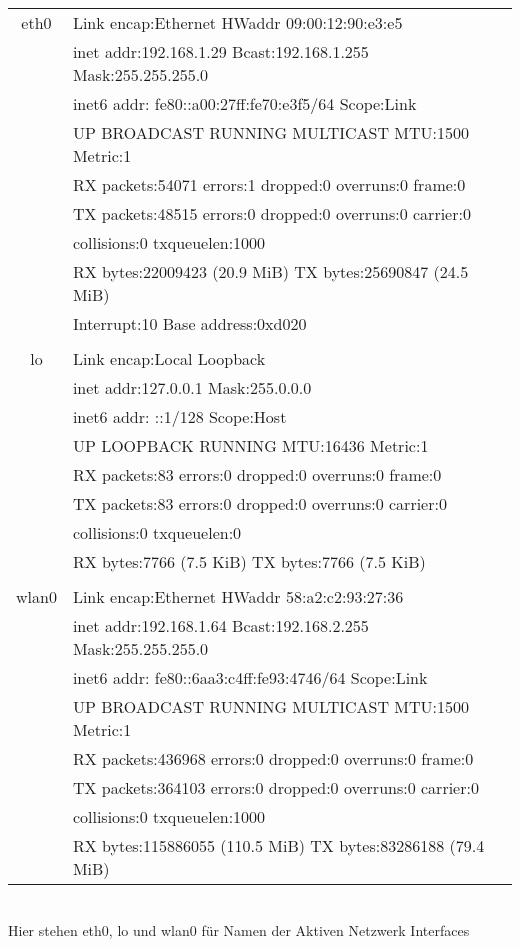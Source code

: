 \documentclass[12pt,a4paper]{report}
\theoremstyle{definition}
\begin{document}
\begin{tabular}{c l}
eth0 & Link encap:Ethernet  HWaddr 09:00:12:90:e3:e5\\  
 & inet addr:192.168.1.29 Bcast:192.168.1.255  Mask:255.255.255.0\\
 & inet6 addr: fe80::a00:27ff:fe70:e3f5/64 Scope:Link\\
 & UP BROADCAST RUNNING MULTICAST  MTU:1500  Metric:1\\
 & RX packets:54071 errors:1 dropped:0 overruns:0 frame:0\\
 & TX packets:48515 errors:0 dropped:0 overruns:0 carrier:0\\
 & collisions:0 txqueuelen:1000 \\
 & RX bytes:22009423 (20.9 MiB)  TX bytes:25690847 (24.5 MiB)\\
 & Interrupt:10 Base address:0xd020 \\
 & \\
lo & Link encap:Local Loopback  \\
 & inet addr:127.0.0.1  Mask:255.0.0.0\\
 & inet6 addr: ::1/128 Scope:Host\\
 & UP LOOPBACK RUNNING  MTU:16436  Metric:1\\
 & RX packets:83 errors:0 dropped:0 overruns:0 frame:0\\
 & TX packets:83 errors:0 dropped:0 overruns:0 carrier:0\\
 & collisions:0 txqueuelen:0 \\
 & RX bytes:7766 (7.5 KiB)  TX bytes:7766 (7.5 KiB)\\
 & \\
wlan0 & Link encap:Ethernet  HWaddr 58:a2:c2:93:27:36  \\
 & inet addr:192.168.1.64  Bcast:192.168.2.255  Mask:255.255.255.0\\
 & inet6 addr: fe80::6aa3:c4ff:fe93:4746/64 Scope:Link\\
 & UP BROADCAST RUNNING MULTICAST  MTU:1500  Metric:1\\
 & RX packets:436968 errors:0 dropped:0 overruns:0 frame:0\\
 & TX packets:364103 errors:0 dropped:0 overruns:0 carrier:0\\
 & collisions:0 txqueuelen:1000 \\
 & RX bytes:115886055 (110.5 MiB)  TX bytes:83286188 (79.4 MiB)\\
\end{tabular}
\ \\
Hier stehen eth0, lo und wlan0 für Namen der Aktiven Netzwerk Interfaces\\
\end{document}
